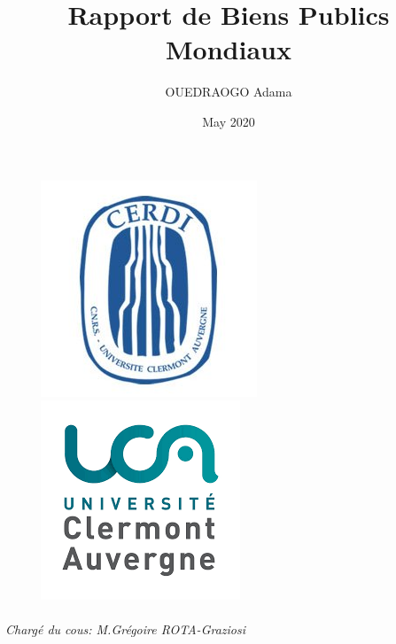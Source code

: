 \documentclass[12pt]{article}
\begin{document}
\begin{figure}
\includegraphics[width=.5\textwidth]{cerdi.jpg}
\includegraphics[width=.5\textwidth]{download.png}
\end{figure}
\title{Rapport de Biens Publics Mondiaux}
\author{OUEDRAOGO Adama }
\date{May 2020}

\maketitle
\begin{center}
\newline
\paragraph{}
\paragraph{}
\textit{Chargé du cous: M.Grégoire ROTA-Graziosi}
\end{center}
\newpage


\maketitle
\end{document}
